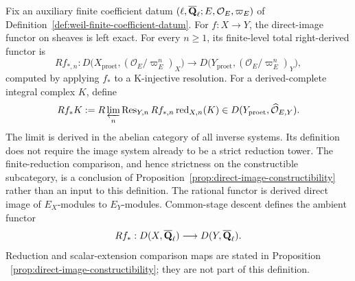 \begin{definition}
\label{def:derived-direct-image}


Fix an auxiliary finite coefficient datum
\((\ell,\overline{\mathbf Q}_\ell;E,\mathcal O_E,\varpi_E)\) of
Definition~\ref{def:weil-finite-coefficient-datum}.
For \(f:X\to Y\), the direct-image functor on sheaves is left exact.  For
every \(n\geq1\), its finite-level total right-derived functor is
\[
 Rf_{*,n}:
 D\bigl(X_{\mathrm{proet}},(\mathcal O_E/\varpi_E^n)_X\bigr)
 \longrightarrow
 D\bigl(Y_{\mathrm{proet}},(\mathcal O_E/\varpi_E^n)_Y\bigr),
\]
computed by applying \(f_*\) to a K-injective resolution.  For a
derived-complete integral complex \(K\), define
\[
 Rf_*K:=
 R\varprojlim_n\operatorname{Res}_{Y,n}
 Rf_{*,n}\operatorname{red}_{X,n}(K)
 \in D(Y_{\mathrm{proet}},\widehat{\mathcal O}_{E,Y}).
\]
The limit is derived in the abelian category of all inverse systems.  Its
definition does not require the image system already to be a strict
reduction tower.  The finite-reduction comparison, and hence strictness on
the constructible subcategory, is a conclusion of
Proposition~\ref{prop:direct-image-constructibility} rather than an input to
this definition.
The rational functor is derived direct image of \(E_X\)-modules to
\(E_Y\)-modules.  Common-stage descent defines the ambient functor
\[
 Rf_*:D(X,\overline{\mathbf Q}_\ell)\longrightarrow D(Y,\overline{\mathbf Q}_\ell).
\]
Reduction and scalar-extension
comparison maps are stated in Proposition
~\ref{prop:direct-image-constructibility}; they are not part of this
definition.
\end{definition}


